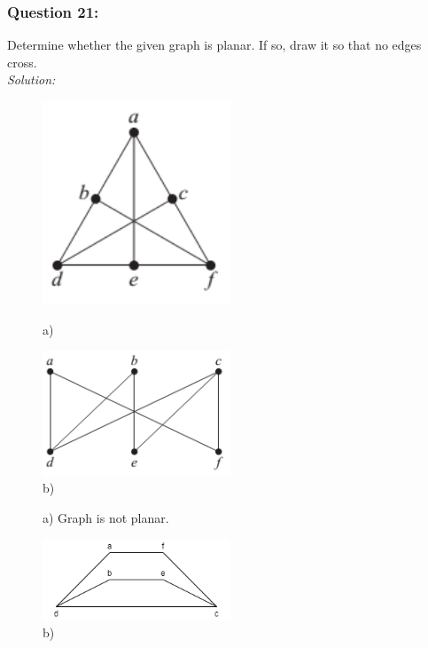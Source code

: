 \documentclass[a4paper]{article}
\begin{document}
	\subsubsection*{Question 21:}
	Determine whether the given graph is planar. If so, draw it so that no edges cross. \\
	\textit{Solution:}\\
	\begin{figure}[H]
		\begin{minipage}{0.5\textwidth}
			\centering
			\includegraphics[width=0.5\textwidth]{tut921_1.png}
			\caption*{a)}
		\end{minipage}
		\begin{minipage}{0.5\textwidth}
			\centering
			\includegraphics[width=0.5\textwidth]{tut921_2.png}
			\caption*{b)}
		\end{minipage}
	\end{figure}
	\begin{figure}[H]
		\begin{minipage}{0.5\textwidth}
			\centering
			\caption*{a) Graph is not planar.}
		\end{minipage}
		\begin{minipage}{0.5\textwidth}
			\centering
			\includegraphics[width=0.5\textwidth]{tut921_4.png}
			\caption*{b)}
		\end{minipage}
	\end{figure}
	
\end{document}

